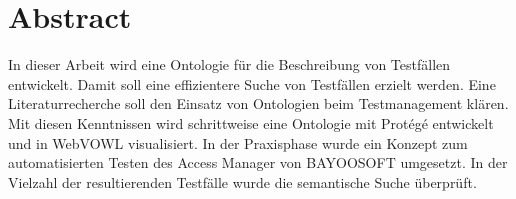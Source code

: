 \chapter*{Abstract}
In dieser Arbeit wird eine Ontologie für die Beschreibung von Testfällen entwickelt. Damit soll eine effizientere Suche von Testfällen erzielt werden. Eine Literaturrecherche soll den Einsatz von Ontologien beim Testmanagement klären. Mit diesen Kenntnissen wird schrittweise eine Ontologie mit Protégé entwickelt und in WebVOWL visualisiert. In der Praxisphase wurde ein Konzept zum automatisierten Testen des Access Manager von BAYOOSOFT umgesetzt. In der Vielzahl der resultierenden Testfälle wurde die semantische Suche überprüft. 